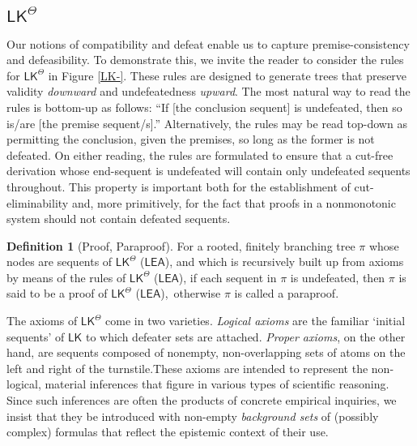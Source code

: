 \documentclass{article}
\newcounter{fncntr}
\newcommand{\fnmark}[1]{\refstepcounter{fncntr}\label{#1}\footnotemark[\getrefnumber{#1}]}
\theoremstyle{definition}
\theoremstyle{definition}
\theoremstyle{definition}
\theoremstyle{definition}
\newtheorem{definition}{Definition}
\theoremstyle{remark}
\theoremstyle{definition}
\theoremstyle{definition}
\begin{document}
\subsection{$ \mathsf{LK^\Theta}$}
Our notions of compatibility and defeat enable us to capture premise-consistency and defeasibility.  To demonstrate this, we invite the reader to consider the rules for $ \mathsf{LK^\Theta}$ in Figure \ref{LK-}. These rules are designed to generate trees that preserve validity \textit{downward} and undefeatedness \textit{upward}. The most natural way to read the rules is bottom-up as follows: ``If [the conclusion sequent] is undefeated, then so is/are [the premise sequent/s].'' Alternatively, the rules may be read top-down as permitting the conclusion, given the premises, so long as the former is not defeated. On either reading, the rules are formulated to ensure that a cut-free derivation whose end-sequent is undefeated will contain only undefeated sequents throughout. This property is important both for the establishment of cut-eliminability and, more primitively, for the fact that proofs in a nonmonotonic system should not contain defeated sequents.

\begin{definition}[Proof, Paraproof]\label{proof}
	For a rooted, finitely branching tree $ \pi $ whose nodes are sequents of $ \mathsf{LK^\Theta}$ ($\mathsf{LEA}$), and which is recursively built up from axioms by means of the rules of $ \mathsf{LK^\Theta}$ ($\mathsf{LEA}$), if each sequent in $ \pi $ is undefeated, then $ \pi $ is said to be a proof of $ \mathsf{LK^\Theta}$  ($\mathsf{LEA}$), \,otherwise $ \pi $ is called a paraproof.
\end{definition}

The axioms of $ \mathsf{LK^\Theta}$ come in two varieties. \textit{Logical axioms} are the familiar `initial sequents' of $ \mathsf{LK} $ to which defeater sets are attached. \textit{Proper axioms}, on the other hand, are sequents composed of nonempty, non-overlapping sets of atoms on the left and right of the turnstile.\fnmark{propax} These axioms are intended to represent the non-logical, material inferences that figure in various types of scientific reasoning. Since such inferences are often the products of concrete empirical inquiries, we insist that they be introduced with non-empty \textit{background sets} of (possibly complex) formulas that reflect the epistemic context of their use. 
\end{document}
